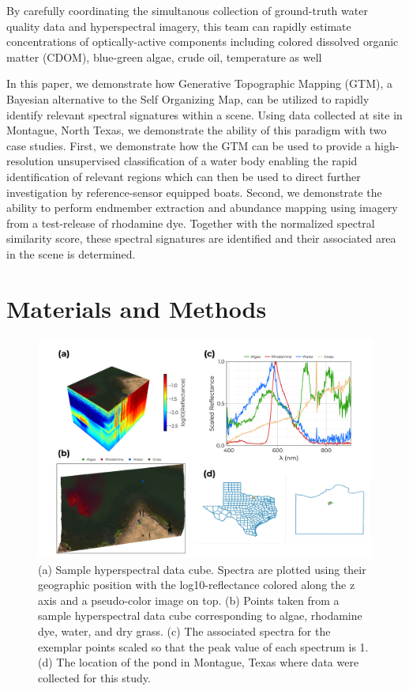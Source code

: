 \documentclass[remotesensing,article,submit,pdftex,moreauthors]{Definitions/mdpi}
\begin{document}
By carefully coordinating the simultanous collection of ground-truth water quality data and hyperspectral imagery, this team can rapidly estimate concentrations of optically-active components including colored dissolved organic matter (CDOM), blue-green algae, crude oil, temperature as well 

In this paper, we demonstrate how Generative Topographic Mapping (GTM), a Bayesian alternative to the Self Organizing Map, can be utilized to rapidly identify relevant spectral signatures within a scene. Using data collected at site in Montague, North Texas, we demonstrate the ability of this paradigm with two case studies. First, we demonstrate how the GTM can be used to provide a high-resolution unsupervised classification of a water body enabling the rapid identification of relevant regions which can then be used to direct further investigation by reference-sensor equipped boats. Second, we demonstrate the ability to perform endmember extraction and abundance mapping using imagery from a test-release of rhodamine dye. Together with the normalized spectral similarity score, these spectral signatures are identified and their associated area in the scene is determined.




\section{Materials and Methods}

\begin{figure}[t]
\centering
\includegraphics[width=\columnwidth]{paper/figures/methods/sample-spectra.pdf}
\caption{(a) Sample hyperspectral data cube. Spectra are plotted using their geographic position with the log10-reflectance colored along the z axis and a pseudo-color image on top. (b) Points taken from a sample hyperspectral data cube corresponding to algae, rhodamine dye, water, and dry grass. (c) The associated spectra for the exemplar points scaled so that the peak value of each spectrum is 1. (d) The location of the pond in Montague, Texas where data were collected for this study.\label{fig:sample-spectra}}
\end{figure}  
\end{document}
